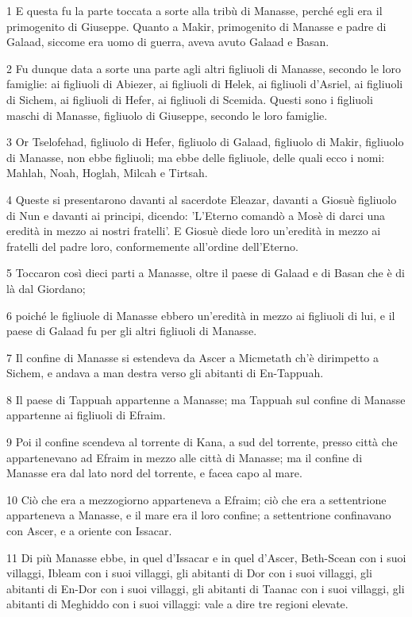 \par 1 E questa fu la parte toccata a sorte alla tribù di Manasse, perché egli era il primogenito di Giuseppe. Quanto a Makir, primogenito di Manasse e padre di Galaad, siccome era uomo di guerra, aveva avuto Galaad e Basan.
\par 2 Fu dunque data a sorte una parte agli altri figliuoli di Manasse, secondo le loro famiglie: ai figliuoli di Abiezer, ai figliuoli di Helek, ai figliuoli d'Asriel, ai figliuoli di Sichem, ai figliuoli di Hefer, ai figliuoli di Scemida. Questi sono i figliuoli maschi di Manasse, figliuolo di Giuseppe, secondo le loro famiglie.
\par 3 Or Tselofehad, figliuolo di Hefer, figliuolo di Galaad, figliuolo di Makir, figliuolo di Manasse, non ebbe figliuoli; ma ebbe delle figliuole, delle quali ecco i nomi: Mahlah, Noah, Hoglah, Milcah e Tirtsah.
\par 4 Queste si presentarono davanti al sacerdote Eleazar, davanti a Giosuè figliuolo di Nun e davanti ai principi, dicendo: 'L'Eterno comandò a Mosè di darci una eredità in mezzo ai nostri fratelli'. E Giosuè diede loro un'eredità in mezzo ai fratelli del padre loro, conformemente all'ordine dell'Eterno.
\par 5 Toccaron così dieci parti a Manasse, oltre il paese di Galaad e di Basan che è di là dal Giordano;
\par 6 poiché le figliuole di Manasse ebbero un'eredità in mezzo ai figliuoli di lui, e il paese di Galaad fu per gli altri figliuoli di Manasse.
\par 7 Il confine di Manasse si estendeva da Ascer a Micmetath ch'è dirimpetto a Sichem, e andava a man destra verso gli abitanti di En-Tappuah.
\par 8 Il paese di Tappuah appartenne a Manasse; ma Tappuah sul confine di Manasse appartenne ai figliuoli di Efraim.
\par 9 Poi il confine scendeva al torrente di Kana, a sud del torrente, presso città che appartenevano ad Efraim in mezzo alle città di Manasse; ma il confine di Manasse era dal lato nord del torrente, e facea capo al mare.
\par 10 Ciò che era a mezzogiorno apparteneva a Efraim; ciò che era a settentrione apparteneva a Manasse, e il mare era il loro confine; a settentrione confinavano con Ascer, e a oriente con Issacar.
\par 11 Di più Manasse ebbe, in quel d'Issacar e in quel d'Ascer, Beth-Scean con i suoi villaggi, Ibleam con i suoi villaggi, gli abitanti di Dor con i suoi villaggi, gli abitanti di En-Dor con i suoi villaggi, gli abitanti di Taanac con i suoi villaggi, gli abitanti di Meghiddo con i suoi villaggi: vale a dire tre regioni elevate.
